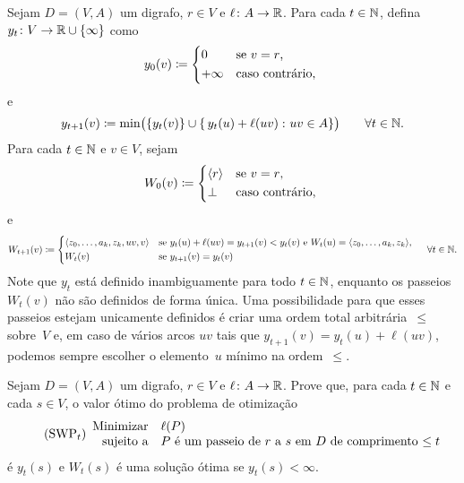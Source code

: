 \documentclass[10pt,reqno]{amsart}
\begin{document}
Sejam \(D = (V,A)\) um digrafo, \(r \in V\) e
\(\ell \colon A \to \mathbb{R}\). Para cada \(t \in \mathbb{N}\), defina
\(y_t \colon V \to \mathbb{R} \cup \{\infty\}\) como
\begin{equation}
  \label{eq:7}
  y_0(v) \coloneqq
  \begin{cases*}
    0       & se \(v = r\),   \\
    +\infty & caso contrário, \\
  \end{cases*}
\end{equation}
e
\begin{equation}
  \label{eq:8}
  y_{t+1}(v) \coloneqq
  \min\paren[\big]{ \set{y_t(v)} \cup \setst{ y_t(u) + \ell(uv)}{ uv \in A }}
  \qquad \forall t \in \Naturals.
\end{equation}
Para cada \(t \in \mathbb{N}\) e \(v \in V\), sejam
\begin{equation}
  \label{eq:9}
  W_0(v) \coloneqq
  \begin{cases*}
    \seq{r} & se \(v = r\),   \\
    \bot    & caso contrário, \\
  \end{cases*}
\end{equation}
e
\begin{equation}
  \label{eq:10}
  W_{t+1}(v) \coloneqq
  \begin{cases*}
    \seq{z_0,\dotsc,a_k,z_k,uv,v} & se \(y_t(u) + \ell(uv) =
    y_{t+1}(v) < y_t(v)\) e \(W_t(u) = \seq{z_0,\dotsc,a_k,z_k}\), \\
    W_t(v) & se \(y_{t+1}(v) = y_t(v)\) \\
  \end{cases*}
  \quad
  \forall t \in \Naturals.
\end{equation}
Note que \(y_t\) está definido inambiguamente para todo
\(t \in \mathbb{N}\), enquanto os passeios \(W_t(v)\) não são definidos
de forma única. Uma possibilidade para que esses passeios estejam
unicamente definidos é criar uma ordem total arbitrária~\(\leq\)
sobre~\(V\) e, em caso de vários arcos \(uv\) tais que
\(y_{t+1}(v) = y_t(u) + \ell(uv)\), podemos sempre escolher o
elemento~\(u\) mínimo na ordem~\(\leq\).

\begin{exercise}
  \label{ex:5}
  Sejam \(D = (V,A)\) um digrafo, \(r \in V\) e
  \(\ell \colon A \to \mathbb{R}\). Prove que, para cada
  \(t \in \mathbb{N}\) e cada \(s \in V\), o valor ótimo do problema de
  otimização
  \begin{equation}
    \tag{SWP\({}_t\)}
    \begin{array}{{rl}}
      \text{Minimizar}   & \ell(P) \\
      \text{sujeito a} & \text{\(P\) é um passeio de~\(r\) a~\(s\) em~\(D\) de comprimento \(\leq t\)} \\
    \end{array}
  \end{equation}
  é \(y_t(s)\) e \(W_t(s)\) é uma solução ótima se
  \(y_t(s) < \infty\).
\end{exercise}
\end{document}
